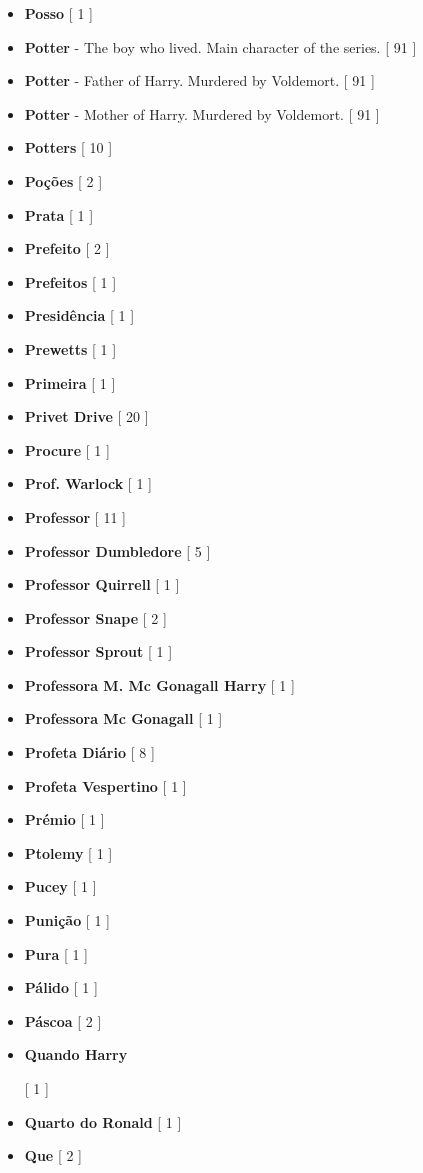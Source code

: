 \documentclass[a4paper]{article}
\begin{document}
\begin{itemize}
	\item \textbf{Posso} [ 1 ]
	\item \textbf{Potter} - The boy who lived. Main character of the series. [ 91 ]
	\item \textbf{Potter} - Father of Harry. Murdered by Voldemort. [ 91 ]
	\item \textbf{Potter} - Mother of Harry. Murdered by Voldemort. [ 91 ]
	\item \textbf{Potters} [ 10 ]
	\item \textbf{Poções} [ 2 ]
	\item \textbf{Prata} [ 1 ]
	\item \textbf{Prefeito} [ 2 ]
	\item \textbf{Prefeitos} [ 1 ]
	\item \textbf{Presidência} [ 1 ]
	\item \textbf{Prewetts} [ 1 ]
	\item \textbf{Primeira} [ 1 ]
	\item \textbf{Privet Drive} [ 20 ]
	\item \textbf{Procure} [ 1 ]
	\item \textbf{Prof. Warlock} [ 1 ]
	\item \textbf{Professor} [ 11 ]
	\item \textbf{Professor Dumbledore} [ 5 ]
	\item \textbf{Professor Quirrell} [ 1 ]
	\item \textbf{Professor Snape} [ 2 ]
	\item \textbf{Professor Sprout} [ 1 ]
	\item \textbf{Professora M. Mc Gonagall Harry} [ 1 ]
	\item \textbf{Professora Mc Gonagall} [ 1 ]
	\item \textbf{Profeta Diário} [ 8 ]
	\item \textbf{Profeta Vespertino} [ 1 ]
	\item \textbf{Prémio} [ 1 ]
	\item \textbf{Ptolemy} [ 1 ]
	\item \textbf{Pucey} [ 1 ]
	\item \textbf{Punição} [ 1 ]
	\item \textbf{Pura} [ 1 ]
	\item \textbf{Pálido} [ 1 ]
	\item \textbf{Páscoa} [ 2 ]
	\item \hypertarget{Q}{\textbf{Quando Harry}} [ 1 ]
	\item \textbf{Quarto do Ronald} [ 1 ]
	\item \textbf{Que} [ 2 ]

\end{itemize}
\end{document}
